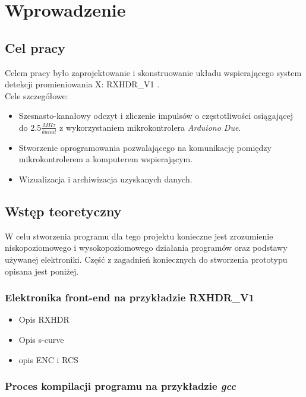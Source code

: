 \section{Wprowadzenie}
\subsection{Cel pracy}

Celem pracy było zaprojektowanie i skonstruowanie układu wspierającego system detekcji promieniowania X: RXHDR\_V1 \cite{master}.\\
Cele szczegółowe:
\begin{itemize}
        \item Szesnasto-kanałowy odczyt i zliczenie impulsów o częstotliwości osiągającej do 2.5$\frac{MHz}{kanal}$ z wykorzystaniem mikrokontrolera \textit{Arduiono Due}.
        \item Stworzenie oprogramowania pozwalającego na komunikację pomiędzy mikrokontrolerem a komputerem wspierającym. 
        \item Wizualizacja i archiwizacja uzyskanych danych. 
\end{itemize}

\subsection{Wstęp teoretyczny}

W celu stworzenia programu dla tego projektu konieczne jest zrozumienie niskopoziomowego i wysokopoziomowego działania programów oraz podstawy używanej elektroniki. Część z zagadnień koniecznych do stworzenia prototypu opisana jest poniżej. 

\subsubsection{Elektronika front-end na przykładzie RXHDR\_V1}

\begin{itemize}
        \item Opis RXHDR
        \item Opis s-curve
        \item opis ENC i RCS
\end{itemize}

\subsubsection{Proces kompilacji programu na przykładzie \textit{gcc}}

